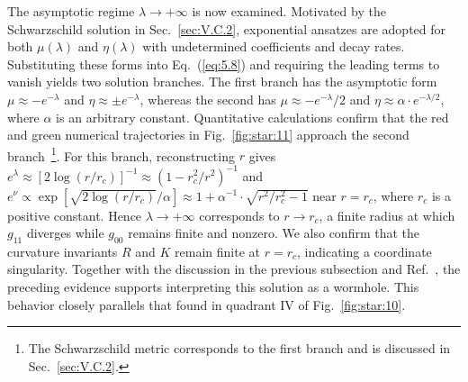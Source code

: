 \documentclass[aps,prd,twocolumn]{revtex4-2}
\begin{document}
The asymptotic regime $\lambda\rightarrow+\infty$ is now examined. Motivated by the Schwarzschild solution in Sec.~\ref{sec:V.C.2}, exponential ansatzes are adopted for both $\mu(\lambda)$ and $\eta(\lambda)$ with undetermined coefficients and decay rates. Substituting these forms into Eq.~(\ref{eq:5.8}) and requiring the leading terms to vanish yields two solution branches. The first branch has the asymptotic form $\mu\approx-e^{-\lambda}$ and $\eta\approx\pm e^{-\lambda}$, whereas the second has $\mu\approx-e^{-\lambda}/2$ and $\eta\approx\alpha\cdot e^{-\lambda/2}$, where $\alpha$ is an arbitrary constant. Quantitative calculations \cite{NotShown} confirm that the red and green numerical trajectories in Fig.~\ref{fig:star:11} approach the second branch~\footnote{The Schwarzschild metric corresponds to the first branch and is discussed in Sec.~\ref{sec:V.C.2}.}. For this branch, reconstructing $r$ gives $e^\lambda\approx [2\log(r/r_c)]^{-1} \approx (1-r_c^2/r^2)^{-1}$ and $e^\nu\propto\exp[\sqrt{2\log(r/r_c)}/\alpha]\approx1+\alpha^{-1}\cdot\sqrt{r^2/r_c^2-1}$ near $r=r_c$, where $r_c$ is a positive constant. Hence $\lambda\rightarrow+\infty$ corresponds to $r\rightarrow r_c$, a finite radius at which $g_{11}$ diverges while $g_{00}$ remains finite and nonzero. We also confirm that the curvature invariants $R$ and $K$ remain finite at $r=r_c$, indicating a coordinate singularity. Together with the discussion in the previous subsection and Ref.~\cite{Morris1988.AmJPhys.56.395}, the preceding evidence supports interpreting this solution as a wormhole. This behavior closely parallels that found in quadrant IV of Fig.~\ref{fig:star:10}.
\end{document}
